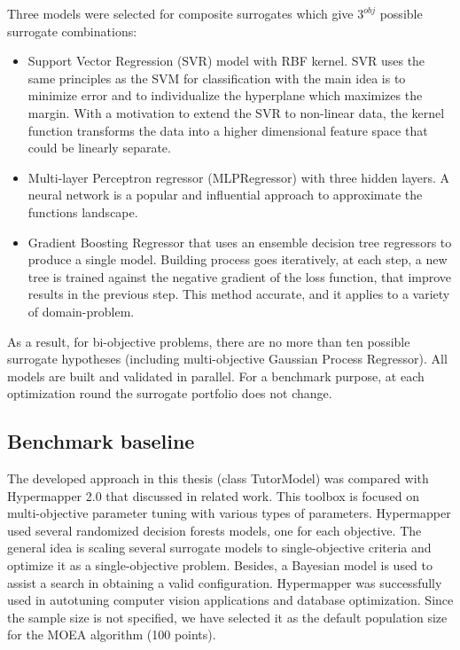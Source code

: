     Three models were selected for composite surrogates which give $3^{obj}$ possible surrogate combinations: 
    \begin{itemize}
        \item Support Vector Regression (SVR) model with RBF kernel. SVR uses the same principles as the SVM for classification with the main idea is to minimize error and to individualize the hyperplane which maximizes the margin. With a motivation to extend the SVR to non-linear data, the kernel function transforms the data into a higher dimensional feature space that could be linearly separate.
        \item Multi-layer Perceptron regressor (MLPRegressor) with three hidden layers. A neural network is a popular and influential approach to approximate the functions landscape.
        \item Gradient Boosting Regressor that uses an ensemble decision tree regressors to produce a single model. Building process goes iteratively, at each step, a new tree is trained against the negative gradient of the loss function, that improve results in the previous step. This method accurate, and it applies to a variety of domain-problem.
    \end{itemize}
    
    As a result, for bi-objective problems, there are no more than ten possible surrogate hypotheses (including multi-objective Gaussian Process Regressor). All models are built and validated in parallel.  For a benchmark purpose, at each optimization round the surrogate portfolio does not change. 

    \subsection{Benchmark baseline}
    The developed approach in this thesis (class TutorModel) was compared with Hypermapper 2.0\cite{nardi2019practical} that discussed in related work. This toolbox is focused on multi-objective parameter tuning with various types of parameters. Hypermapper used several randomized decision forests models, one for each objective. The general idea is scaling several surrogate models to single-objective criteria and optimize it as a single-objective problem. Besides, a Bayesian model is used to assist a search in obtaining a valid configuration. Hypermapper was successfully used in autotuning computer vision applications and database optimization. Since the sample size is not specified, we have selected it as the default population size for the MOEA algorithm (100 points).

